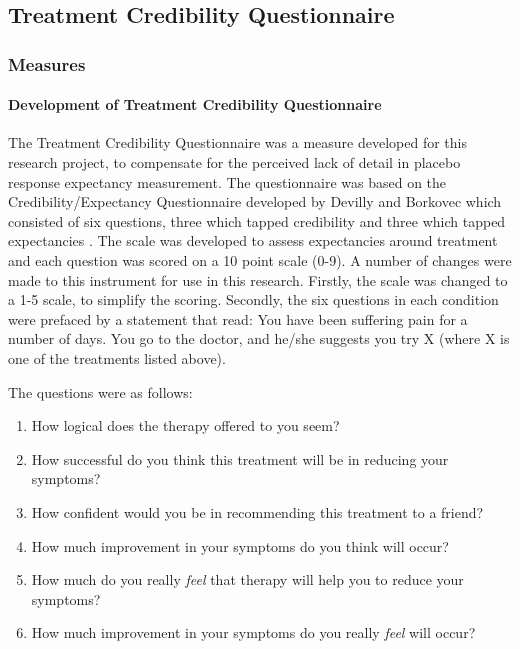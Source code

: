 \subsection{Treatment Credibility Questionnaire}

\subsubsection{Measures}

\paragraph{Development of Treatment Credibility Questionnaire}

The Treatment Credibility Questionnaire was a measure developed for this research project, to compensate for the perceived lack of detail in placebo response expectancy measurement. The questionnaire was based on the Credibility/Expectancy Questionnaire developed by Devilly and Borkovec which consisted of six questions, three which tapped credibility and three which tapped expectancies \cite{Devilly2000}. The scale was developed to assess expectancies around treatment and each question was scored on a 10 point scale (0-9). A number of changes were made to this instrument for use in this research. Firstly, the scale was changed to a 1-5 scale, to simplify the scoring. Secondly, the six questions in each condition were prefaced by a statement that read: You have been suffering pain for a number of days. You go to the doctor, and he/she suggests you try X (where X is one of the treatments listed above).

The questions were as follows:


\begin{enumerate}
	\item How logical does the therapy offered to you seem?
	\item How successful do you think this treatment will be in reducing your symptoms?
 	\item How confident would you be in recommending this treatment to a friend?
	\item How much improvement in your symptoms do you think will occur?
	\item How much do you really \textit{feel} that therapy will help you to reduce your symptoms?
	\item How much improvement in your symptoms do you really \textit{feel} will occur?
\end{enumerate}

